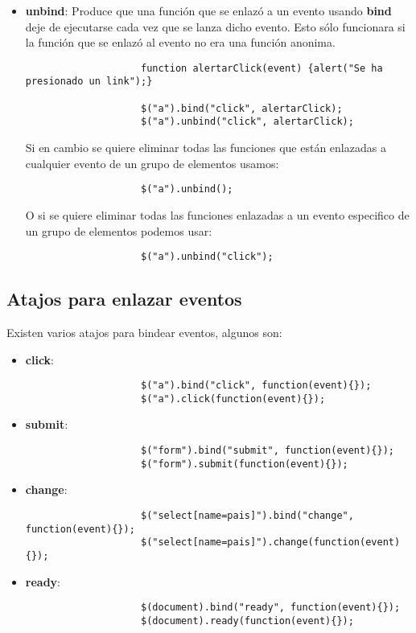 \documentclass[10pt]{beamer}
\begin{document}
\begin{frame}[fragile]
	\begin{itemize}
		\pause \item \textbf{unbind}: Produce que una función que se enlazó a un evento usando \textbf{bind} deje de ejecutarse
				cada vez que se lanza dicho evento. Esto sólo funcionara si la función que se enlazó al evento no era una
				función anonima. 
				\pause \begin{lstlisting}
					function alertarClick(event) {alert("Se ha presionado un link");}
					
					$("a").bind("click", alertarClick);
					$("a").unbind("click", alertarClick);
				\end{lstlisting}
				
				\pause Si en cambio se quiere eliminar todas las funciones que están enlazadas a cualquier evento
					de un grupo de elementos usamos:
				\pause \begin{lstlisting}
					$("a").unbind();
				\end{lstlisting}
				
				\pause O si se quiere eliminar todas las funciones enlazadas a un evento especifico de un grupo de
					elementos podemos usar:
				\pause \begin{lstlisting}
					$("a").unbind("click");
				\end{lstlisting}
	\end{itemize}
\end{frame}

\subsection{Atajos para enlazar eventos}
\begin{frame}[fragile]
	\pause Existen varios atajos para bindear eventos, algunos son:
	\begin{itemize}
		\pause \item \textbf{click}:
		\pause \begin{lstlisting}
					$("a").bind("click", function(event){});
					$("a").click(function(event){});
				\end{lstlisting}
		\pause \item \textbf{submit}:
		\pause \begin{lstlisting}
					$("form").bind("submit", function(event){});
					$("form").submit(function(event){});
				\end{lstlisting}
		\pause \item \textbf{change}:
		\pause \begin{lstlisting}
					$("select[name=pais]").bind("change", function(event){});
					$("select[name=pais]").change(function(event){});
				\end{lstlisting}
		\pause \item \textbf{ready}:
		\pause \begin{lstlisting}
					$(document).bind("ready", function(event){});
					$(document).ready(function(event){});
				\end{lstlisting}
	\end{itemize}
\end{frame}
\end{document}
